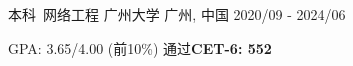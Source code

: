 

\begin{cventries}

  \cventry
    {本科\ 网络工程} %
    {广州大学} %
    {广州, 中国} %
    {2020/09 - 2024/06} %
    {
      \begin{cvitems} %
        \item {GPA: 3.65/4.00 (前10\%) \hspace{1mm} 通过\textbf{CET-6: 552}}
      \end{cvitems}
    }

\end{cventries}
